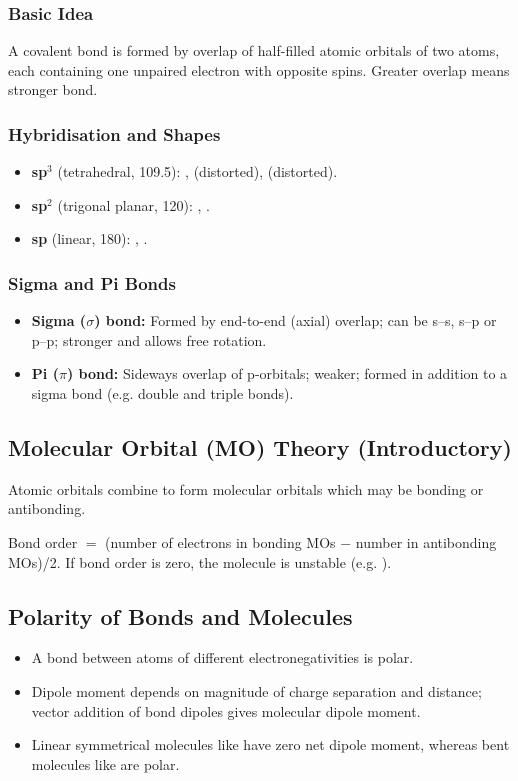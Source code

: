 \documentclass[12pt,a4paper]{article}
\begin{document}
\subsubsection{Basic Idea}
A covalent bond is formed by overlap of half-filled atomic orbitals of two atoms, each containing one unpaired electron with opposite spins. Greater overlap means stronger bond.

\subsubsection{Hybridisation and Shapes}
\begin{itemize}
    \item \textbf{sp$^3$} (tetrahedral, 109.5\degree): ,  (distorted),  (distorted).
    \item \textbf{sp$^2$} (trigonal planar, 120\degree): , .
    \item \textbf{sp} (linear, 180\degree): , .
\end{itemize}

\subsubsection{Sigma and Pi Bonds}
\begin{itemize}
    \item \textbf{Sigma ($\sigma$) bond:} Formed by end-to-end (axial) overlap; can be s–s, s–p or p–p; stronger and allows free rotation.
    \item \textbf{Pi ($\pi$) bond:} Sideways overlap of p-orbitals; weaker; formed in addition to a sigma bond (e.g. double and triple bonds).
\end{itemize}

\subsection{Molecular Orbital (MO) Theory (Introductory)}
Atomic orbitals combine to form molecular orbitals which may be bonding or antibonding.  

Bond order $=$ (number of electrons in bonding MOs $-$ number in antibonding MOs)/2.  
If bond order is zero, the molecule is unstable (e.g. ).

\subsection{Polarity of Bonds and Molecules}
\begin{itemize}
    \item A bond between atoms of different electronegativities is polar.
    \item Dipole moment depends on magnitude of charge separation and distance; vector addition of bond dipoles gives molecular dipole moment.
    \item Linear symmetrical molecules like  have zero net dipole moment, whereas bent molecules like  are polar.
\end{itemize}
\end{document}
